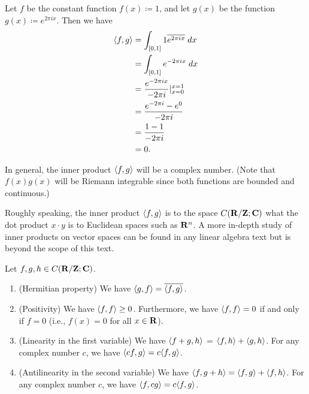 \begin{example}\label{5.2.3}
  Let \(f\) be the constant function \(f(x) \coloneqq 1\), and let \(g(x)\) be the function \(g(x) \coloneqq e^{2 \pi i x}\).
  Then we have
  \begin{align*}
    \inner*{f, g} & = \int_{[0, 1]} 1 \overline{e^{2 \pi i x}} \; dx      \\
                  & = \int_{[0, 1]} e^{- 2 \pi i x} \; dx                 \\
                  & = \frac{e^{- 2 \pi i x}}{- 2 \pi i} |_{x = 0}^{x = 1} \\
                  & = \frac{e^{- 2 \pi i } - e^0}{- 2 \pi i}              \\
                  & = \frac{1 - 1}{- 2 \pi i}                             \\
                  & = 0.
  \end{align*}
\end{example}

\begin{remark}\label{5.2.4}
  In general, the inner product \(\inner*{f, g}\) will be a complex number.
  (Note that \(f(x) \overline{g(x)}\) will be Riemann integrable since both functions are bounded and continuous.)
\end{remark}

\begin{note}
  Roughly speaking, the inner product \(\inner*{f, g}\) is to the space \(C(\R / \Z ; \C)\) what the dot product \(x \cdot y\) is to Euclidean spaces such as \(\R^n\).
  A more in-depth study of inner products on vector spaces can be found in any linear algebra text but is beyond the scope of this text.
\end{note}

\begin{lemma}\label{5.2.5}
  Let \(f, g, h \in C(\R / \Z ; \C)\).
  \begin{enumerate}
    \item (Hermitian property)
          We have \(\inner*{g, f} = \overline{\inner*{f, g}}\).
    \item (Positivity)
          We have \(\inner*{f, f} \geq 0\).
          Furthermore, we have \(\inner*{f, f} = 0\) if and only if \(f = 0\)
          (i.e., \(f(x) = 0\) for all \(x \in \R\)).
    \item (Linearity in the first variable)
          We have \(\inner*{f +g, h}\) = \(\inner*{f, h} + \inner*{g, h}\).
          For any complex number \(c\), we have \(\inner*{cf, g} = c \inner*{f, g}\).
    \item (Antilinearity in the second variable)
          We have \(\inner*{f, g + h} = \inner*{f, g} + \inner*{f, h}\).
          For any complex number \(c\), we have \(\inner*{f, cg} = c \inner*{f, g}\).
  \end{enumerate}
\end{lemma}

